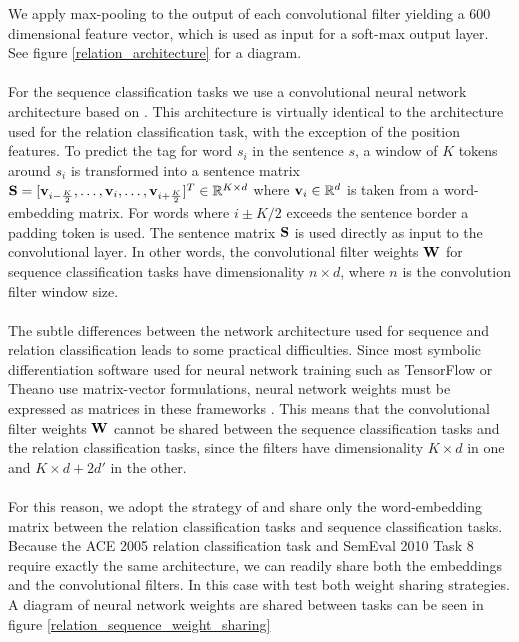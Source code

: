 We apply max-pooling to the output of each convolutional filter yielding a 600 dimensional feature vector, which is used as input for a soft-max output layer. See figure \ref{relation_architecture} for a diagram.
\\\\
For the sequence classification tasks we use a convolutional neural network architecture based on \citet{collobert2011}. This architecture is virtually identical to the architecture used for the relation classification task, with the exception of the position features. To predict the tag for word $s_i$ in the sentence $s$, a window of $K$ tokens around $s_i$ is transformed into a sentence matrix $\mathbf{S} = [\mathbf{v}_{i - \frac{K}{2}},\dots,\mathbf{v}_i,\dots,\mathbf{v}_{i + \frac{K}{2}}]^T \in \mathbb{R}^{K \times d}$ where $\mathbf{v}_i \in \mathbb{R}^d$ is taken from a word-embedding matrix. For words where $i \pm K / 2$ exceeds the sentence border a padding token is used. The sentence matrix $\mathbf{S}$ is used directly as input to the convolutional layer. In other words, the convolutional filter weights $\mathbf{W}$ for sequence classification tasks have dimensionality $n \times d$, where $n$ is the convolution filter window size.
\\\\
The subtle differences between the network architecture used for sequence and relation classification leads to some practical difficulties. Since most symbolic differentiation software used for neural network training such as TensorFlow or Theano use matrix-vector formulations, neural network weights must be expressed as matrices in these frameworks \citep{abadi2016, theano2016}. This means that the convolutional filter weights $\mathbf{W}$ cannot be shared between the sequence classification tasks and the relation classification tasks, since the filters have dimensionality $K \times d$ in one and $K \times d + 2d'$ in the other.
\\\\
For this reason, we adopt the strategy of \citet{collobert2008} and share only the word-embedding matrix between the relation classification tasks and sequence classification tasks. Because the ACE 2005 relation classification task and SemEval 2010 Task 8 require exactly the same architecture, we can readily share both the embeddings and the convolutional filters. In this case with test both weight sharing strategies. A diagram of neural network weights are shared between tasks can be seen in figure \ref{relation_sequence_weight_sharing}
